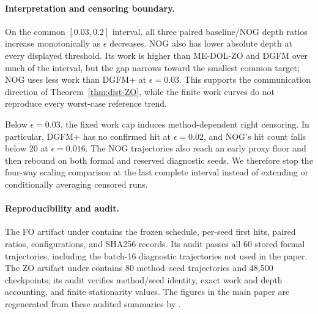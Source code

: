 \paragraph{Interpretation and censoring boundary.}
On the common $[0.03,0.2]$ interval, all three paired baseline/NOG depth
ratios increase monotonically as $\epsilon$ decreases.  NOG also has lower
absolute depth at every displayed threshold.  Its work is higher than
ME-DOL-ZO and DGFM over much of the interval, but the gap narrows toward the
smallest common target; NOG uses less work than DGFM+ at $\epsilon=0.03$.
This supports the communication direction of Theorem~\ref{thm:dist-ZO}, while
the finite work curves do not reproduce every worst-case reference trend.

Below $\epsilon=0.03$, the fixed work cap induces method-dependent right
censoring.  In particular, DGFM+ has no confirmed hit at $\epsilon=0.02$,
and NOG's hit count falls below 20 at $\epsilon=0.016$.  The NOG trajectories
also reach an early proxy floor and then rebound on both formal and reserved
diagnostic seeds.  We therefore stop the four-way scaling comparison at the
last complete interval instead of extending or conditionally averaging
censored runs.

\paragraph{Reproducibility and audit.}
The FO artifact under  contains the frozen
schedule, per-seed first hits, paired ratios, configurations, and SHA256
records.  Its audit passes all 60 stored formal trajectories, including the
batch-16 diagnostic trajectories not used in the paper.  The ZO artifact
under  contains 80 method--seed trajectories and
48,500 checkpoints; its audit verifies method/seed identity, exact work and
depth accounting, and finite stationarity values.  The figures in the main
paper are regenerated from these audited summaries by
.



